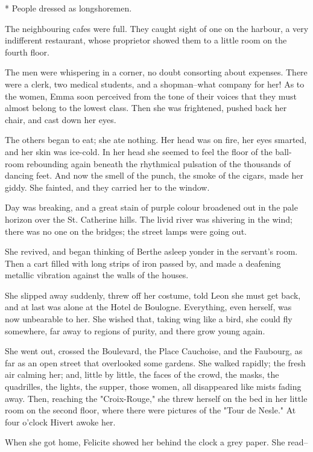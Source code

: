 \documentclass{tufte-book}
\begin{document}
     * People dressed as longshoremen.


The neighbouring cafes were full. They caught sight of one on the
harbour, a very indifferent restaurant, whose proprietor showed them to
a little room on the fourth floor.

The men were whispering in a corner, no doubt consorting about expenses.
There were a clerk, two medical students, and a shopman--what company
for her! As to the women, Emma soon perceived from the tone of their
voices that they must almost belong to the lowest class. Then she was
frightened, pushed back her chair, and cast down her eyes.

The others began to eat; she ate nothing. Her head was on fire, her eyes
smarted, and her skin was ice-cold. In her head she seemed to feel the
floor of the ball-room rebounding again beneath the rhythmical pulsation
of the thousands of dancing feet. And now the smell of the punch, the
smoke of the cigars, made her giddy. She fainted, and they carried her
to the window.

Day was breaking, and a great stain of purple colour broadened out
in the pale horizon over the St. Catherine hills. The livid river was
shivering in the wind; there was no one on the bridges; the street lamps
were going out.

She revived, and began thinking of Berthe asleep yonder in the servant's
room. Then a cart filled with long strips of iron passed by, and made a
deafening metallic vibration against the walls of the houses.

She slipped away suddenly, threw off her costume, told Leon she must get
back, and at last was alone at the Hotel de Boulogne. Everything, even
herself, was now unbearable to her. She wished that, taking wing like a
bird, she could fly somewhere, far away to regions of purity, and there
grow young again.

She went out, crossed the Boulevard, the Place Cauchoise, and the
Faubourg, as far as an open street that overlooked some gardens. She
walked rapidly; the fresh air calming her; and, little by little, the
faces of the crowd, the masks, the quadrilles, the lights, the supper,
those women, all disappeared like mists fading away. Then, reaching the
"Croix-Rouge," she threw herself on the bed in her little room on the
second floor, where there were pictures of the "Tour de Nesle." At four
o'clock Hivert awoke her.

When she got home, Felicite showed her behind the clock a grey paper.
She read--
\end{document}
